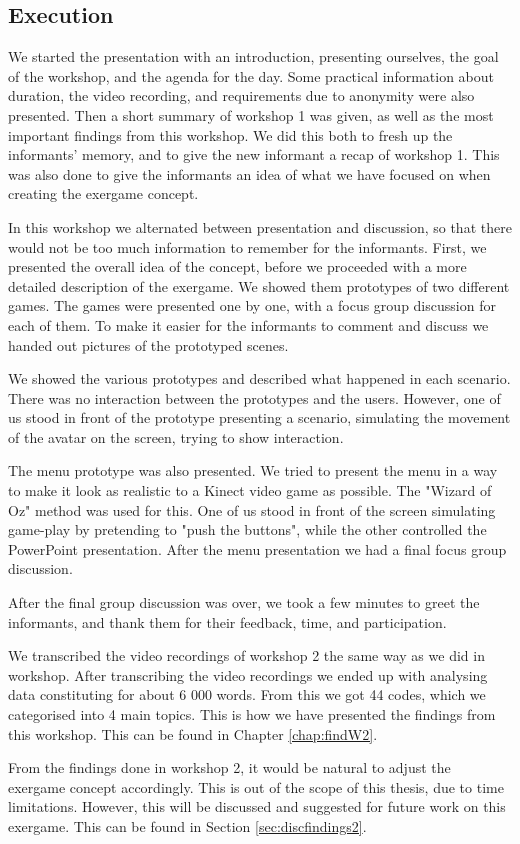 \subsection{Execution}
We started the presentation with an introduction, presenting ourselves, the goal of the workshop, and the agenda for the day. Some practical information about duration, the video recording, and requirements due to anonymity were also presented. Then a short summary of workshop 1 was given, as well as the most important findings from this workshop. We did this both to fresh up the informants' memory, and to give the new informant a recap of workshop 1. This was also done to give the informants an idea of what we have focused on when creating the exergame concept.    

In this workshop we alternated between presentation and discussion, so that there would not be too much information to remember for the informants. First, we presented the overall idea of the concept, before we proceeded with a more detailed description of the exergame. We showed them prototypes of two different games. The games were presented one by one, with a focus group discussion for each of them. To make it easier for the informants to comment and discuss we handed out pictures of the prototyped scenes.

We showed the various prototypes and described what happened in each scenario. There was no interaction between the prototypes and the users. However, one of us stood in front of the prototype presenting a scenario, simulating the movement of the avatar on the screen, trying to show interaction. 

The menu prototype was also presented. We tried to present the menu in a way to make it look as realistic to a Kinect video game as possible. The "Wizard of Oz" method was used for this. One of us stood in front of the screen simulating game-play by pretending to "push the buttons", while the other controlled the PowerPoint presentation.  After the menu presentation we had a final focus group discussion. 

After the final group discussion was over, we took a few minutes to greet the informants, and thank them for their feedback, time, and participation. 

We transcribed the video recordings of workshop 2 the same way as we did in workshop. After transcribing the video recordings we ended up with analysing data constituting for about 6 000 words.  From this we got 44 codes, which we categorised into 4 main topics. This is how we have presented the findings from this workshop. This can be found in Chapter \ref{chap:findW2}.

From the findings done in workshop 2, it would be natural to adjust the exergame concept accordingly. This is out of the scope of this thesis, due to time limitations. However, this will be discussed and suggested for future work on this exergame. This can be found in Section \ref{sec:discfindings2}.

 
 
 

